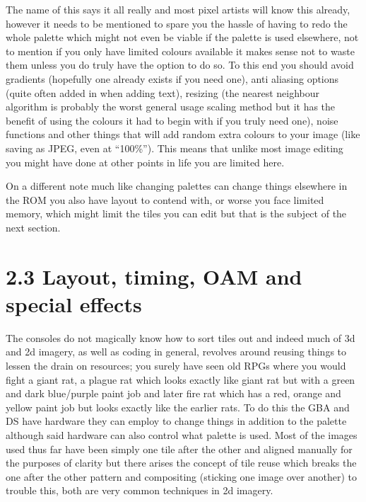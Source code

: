 \documentclass[
]{book}
\begin{document}
The name of this says it all really and most pixel artists will know this already, however it needs to be mentioned to spare you the hassle of having to redo the whole palette which might not even be viable if the palette is used elsewhere, not to mention if you only have limited colours available it makes sense not to waste them unless you do truly have the option to do so. To this end you should avoid gradients (hopefully one already exists if you need one), anti aliasing options (quite often added in when adding text), resizing (the nearest neighbour algorithm is probably the worst general usage scaling method but it has the benefit of using the colours it had to begin with if you truly need one), noise functions and other things that will add random extra colours to your image (like saving as JPEG, even at ``100\%''). This means that unlike most image editing you might have done at other points in life you are limited here.

On a different note much like changing palettes can change things elsewhere in the ROM you also have layout to contend with, or worse you face limited memory, which might limit the tiles you can edit but that is the subject of the next section.

\hypertarget{layout-timing-oam-and-special-effects}{%
\section{2.3 Layout, timing, OAM and special effects}\label{layout-timing-oam-and-special-effects}}

The consoles do not magically know how to sort tiles out and indeed much of 3d and 2d imagery, as well as coding in general, revolves around reusing things to lessen the drain on resources; you surely have seen old RPGs where you would fight a giant rat, a plague rat which looks exactly like giant rat but with a green and dark blue/purple paint job and later fire rat which has a red, orange and yellow paint job but looks exactly like the earlier rats. To do this the GBA and DS have hardware they can employ to change things in addition to the palette although said hardware can also control what palette is used. Most of the images used thus far have been simply one tile after the other and aligned manually for the purposes of clarity but there arises the concept of tile reuse which breaks the one after the other pattern and compositing (sticking one image over another) to trouble this, both are very common techniques in 2d imagery.
\end{document}
